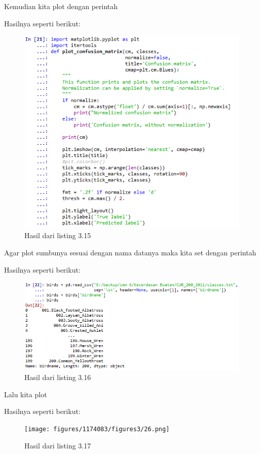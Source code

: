 Kemudian kita plot dengan perintah

Hasilnya seperti berikut:
\begin{figure}[H]
	\centering
	\includegraphics[width=12cm]{figures/1174083/figures3/24.png}
	\caption{Hasil dari listing 3.15}
\end{figure}

Agar plot sumbunya sesuai dengan nama datanya maka kita set dengan perintah

Hasilnya seperti berikut:
\begin{figure}[H]
	\centering
	\includegraphics[width=12cm]{figures/1174083/figures3/25.png}
	\caption{Hasil dari listing 3.16}
\end{figure}

Lalu kita plot

Hasilnya seperti berikut:
\begin{figure}[H]
	\centering
	\texttt{[image: figures/1174083/figures3/26.png]}
	\caption{Hasil dari listing 3.17}
\end{figure}

